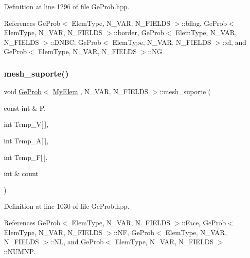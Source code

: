 Definition at line 1296 of file Ge\+Prob.\+hpp.



References Ge\+Prob$<$ Elem\+Type, N\+\_\+\+V\+A\+R, N\+\_\+\+F\+I\+E\+L\+D\+S $>$\+::bflag, Ge\+Prob$<$ Elem\+Type, N\+\_\+\+V\+A\+R, N\+\_\+\+F\+I\+E\+L\+D\+S $>$\+::border, Ge\+Prob$<$ Elem\+Type, N\+\_\+\+V\+A\+R, N\+\_\+\+F\+I\+E\+L\+D\+S $>$\+::\+D\+N\+BC, Ge\+Prob$<$ Elem\+Type, N\+\_\+\+V\+A\+R, N\+\_\+\+F\+I\+E\+L\+D\+S $>$\+::el, and Ge\+Prob$<$ Elem\+Type, N\+\_\+\+V\+A\+R, N\+\_\+\+F\+I\+E\+L\+D\+S $>$\+::\+NG.

\mbox{\label{classGeProb_ab33e0027b5ae2b712b91690b8cb75e90}} 
\subsubsection{\texorpdfstring{mesh\+\_\+suporte()}{mesh\_suporte()}}
{\footnotesize\ttfamily void \hyperlink{classGeProb}{Ge\+Prob}$<$ \hyperlink{DG__Prob_8h_a83cd887ced9a6587428f267e50cd4787}{My\+Elem} , N\+\_\+\+V\+AR, N\+\_\+\+F\+I\+E\+L\+DS $>$\+::mesh\+\_\+suporte (\begin{DoxyParamCaption}\item[{const int \&}]{P,  }\item[{int}]{Temp\+\_\+V\mbox{[}$\,$\mbox{]},  }\item[{int}]{Temp\+\_\+A\mbox{[}$\,$\mbox{]},  }\item[{int}]{Temp\+\_\+F\mbox{[}$\,$\mbox{]},  }\item[{int \&}]{count }\end{DoxyParamCaption})\hspace{0.3cm}{\ttfamily [inherited]}}



Definition at line 1030 of file Ge\+Prob.\+hpp.



References Ge\+Prob$<$ Elem\+Type, N\+\_\+\+V\+A\+R, N\+\_\+\+F\+I\+E\+L\+D\+S $>$\+::\+Face, Ge\+Prob$<$ Elem\+Type, N\+\_\+\+V\+A\+R, N\+\_\+\+F\+I\+E\+L\+D\+S $>$\+::\+NF, Ge\+Prob$<$ Elem\+Type, N\+\_\+\+V\+A\+R, N\+\_\+\+F\+I\+E\+L\+D\+S $>$\+::\+NL, and Ge\+Prob$<$ Elem\+Type, N\+\_\+\+V\+A\+R, N\+\_\+\+F\+I\+E\+L\+D\+S $>$\+::\+N\+U\+M\+NP.

\mbox{\label{classDG__Prob_a6941d468eec44d02bfd3f2eaedf661dc}} 
